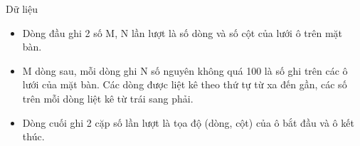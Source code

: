 Dữ liệu
\begin{itemize}
	\item     Dòng đầu ghi 2 số M, N lần lượt là số dòng và số cột của lưới ô trên mặt bàn.   
	\item     M dòng sau, mỗi dòng ghi N số nguyên không quá 100 là số ghi trên các ô lưới của mặt bàn. Các dòng được liệt kê theo thứ tự từ xa đến gần, các số trên mỗi dòng liệt kê từ trái sang phải.   
	\item     Dòng cuối ghi 2 cặp số lần lượt là tọa độ (dòng, cột) của ô bắt đầu và ô kết thúc.   
\end{itemize}